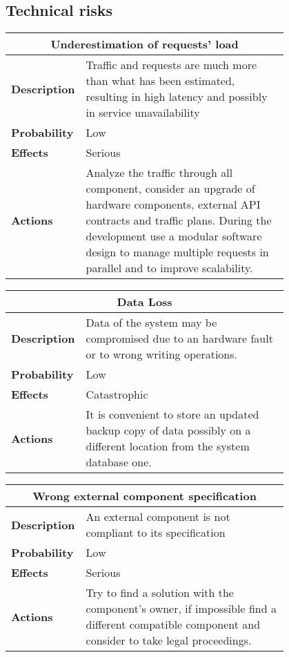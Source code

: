 \subsection{Technical risks}
\begin{longtable}{lp{0.8\linewidth}}
\multicolumn{2}{c}{\textbf{Underestimation of requests' load}}\\
\toprule
\textbf{Description}&Traffic and requests are much more than what has been estimated, resulting in high latency and possibly in service unavailability\\
\midrule
\textbf{Probability}&Low\\
\midrule
\textbf{Effects}&Serious\\
\midrule
\textbf{Actions}&Analyze the traffic through all component, consider an upgrade of hardware components, external API contracts and traffic plans. During the development use a modular software design to manage multiple requests in parallel and to improve scalability.\\
\bottomrule
\end{longtable}

\begin{longtable}{lp{0.8\linewidth}}
\multicolumn{2}{c}{\textbf{Data Loss}}\\
\toprule
\textbf{Description}&Data of the system may be compromised due to an hardware fault or to wrong writing operations.\\
\midrule
\textbf{Probability}&Low\\
\midrule
\textbf{Effects}&Catastrophic\\
\midrule
\textbf{Actions}&It is convenient to store an updated backup copy of data possibly on a different location from the system database one.\\
\bottomrule
\end{longtable}

\begin{longtable}{lp{0.8\linewidth}}
\multicolumn{2}{c}{\textbf{Wrong external component specification}}\\
\toprule
\textbf{Description}&An external component is not compliant to its specification\\
\midrule
\textbf{Probability}&Low\\
\midrule
\textbf{Effects}&Serious\\
\midrule
\textbf{Actions}&Try to find a solution with the component's owner, if impossible find a different compatible component and consider to take legal proceedings.\\
\bottomrule
\end{longtable}

